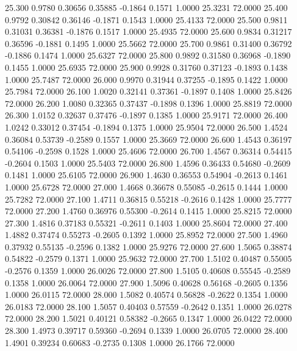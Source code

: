   25.300   0.9780   0.30656   0.35885  -0.1864   0.1571   1.0000  25.3231  72.0000
  25.400   0.9792   0.30842   0.36146  -0.1871   0.1543   1.0000  25.4133  72.0000
  25.500   0.9811   0.31031   0.36381  -0.1876   0.1517   1.0000  25.4935  72.0000
  25.600   0.9834   0.31217   0.36596  -0.1881   0.1495   1.0000  25.5662  72.0000
  25.700   0.9861   0.31400   0.36792  -0.1886   0.1474   1.0000  25.6327  72.0000
  25.800   0.9892   0.31580   0.36968  -0.1890   0.1455   1.0000  25.6935  72.0000
  25.900   0.9928   0.31760   0.37123  -0.1893   0.1438   1.0000  25.7487  72.0000
  26.000   0.9970   0.31944   0.37255  -0.1895   0.1422   1.0000  25.7984  72.0000
  26.100   1.0020   0.32141   0.37361  -0.1897   0.1408   1.0000  25.8426  72.0000
  26.200   1.0080   0.32365   0.37437  -0.1898   0.1396   1.0000  25.8819  72.0000
  26.300   1.0152   0.32637   0.37476  -0.1897   0.1385   1.0000  25.9171  72.0000
  26.400   1.0242   0.33012   0.37454  -0.1894   0.1375   1.0000  25.9504  72.0000
  26.500   1.4524   0.36084   0.53739  -0.2589   0.1557   1.0000  25.3669  72.0000
  26.600   1.4543   0.36197   0.54106  -0.2598   0.1528   1.0000  25.4606  72.0000
  26.700   1.4567   0.36314   0.54415  -0.2604   0.1503   1.0000  25.5403  72.0000
  26.800   1.4596   0.36433   0.54680  -0.2609   0.1481   1.0000  25.6105  72.0000
  26.900   1.4630   0.36553   0.54904  -0.2613   0.1461   1.0000  25.6728  72.0000
  27.000   1.4668   0.36678   0.55085  -0.2615   0.1444   1.0000  25.7282  72.0000
  27.100   1.4711   0.36815   0.55218  -0.2616   0.1428   1.0000  25.7777  72.0000
  27.200   1.4760   0.36976   0.55300  -0.2614   0.1415   1.0000  25.8215  72.0000
  27.300   1.4816   0.37183   0.55321  -0.2611   0.1403   1.0000  25.8604  72.0000
  27.400   1.4882   0.37474   0.55273  -0.2605   0.1392   1.0000  25.8952  72.0000
  27.500   1.4960   0.37932   0.55135  -0.2596   0.1382   1.0000  25.9276  72.0000
  27.600   1.5065   0.38874   0.54822  -0.2579   0.1371   1.0000  25.9632  72.0000
  27.700   1.5102   0.40487   0.55005  -0.2576   0.1359   1.0000  26.0026  72.0000
  27.800   1.5105   0.40608   0.55545  -0.2589   0.1358   1.0000  26.0064  72.0000
  27.900   1.5096   0.40628   0.56168  -0.2605   0.1356   1.0000  26.0115  72.0000
  28.000   1.5082   0.40574   0.56828  -0.2622   0.1354   1.0000  26.0183  72.0000
  28.100   1.5057   0.40403   0.57559  -0.2642   0.1351   1.0000  26.0278  72.0000
  28.200   1.5021   0.40121   0.58382  -0.2665   0.1347   1.0000  26.0422  72.0000
  28.300   1.4973   0.39717   0.59360  -0.2694   0.1339   1.0000  26.0705  72.0000
  28.400   1.4901   0.39234   0.60683  -0.2735   0.1308   1.0000  26.1766  72.0000
